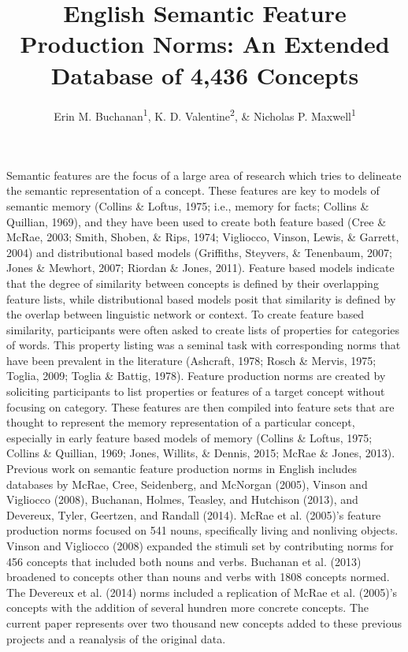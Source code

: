 \documentclass[english,,man]{apa6}
\title{English Semantic Feature Production Norms: An Extended Database of 4,436
Concepts}
\author{Erin M. Buchanan\textsuperscript{1}, K. D. Valentine\textsuperscript{2},
\& Nicholas P. Maxwell\textsuperscript{1}}
\date{}
\affiliation{
\vspace{0.5cm}
\textsuperscript{1} Missouri State University\\\textsuperscript{2} University of Missouri}
\theoremstyle{definition}
\theoremstyle{definition}
\theoremstyle{definition}
\theoremstyle{remark}
\begin{document}
\maketitle

Semantic features are the focus of a large area of research which tries
to delineate the semantic representation of a concept. These features
are key to models of semantic memory (Collins \& Loftus, 1975; i.e.,
memory for facts; Collins \& Quillian, 1969), and they have been used to
create both feature based (Cree \& McRae, 2003; Smith, Shoben, \& Rips,
1974; Vigliocco, Vinson, Lewis, \& Garrett, 2004) and distributional
based models (Griffiths, Steyvers, \& Tenenbaum, 2007; Jones \& Mewhort,
2007; Riordan \& Jones, 2011). Feature based models indicate that the
degree of similarity between concepts is defined by their overlapping
feature lists, while distributional based models posit that similarity
is defined by the overlap between linguistic network or context. To
create feature based similarity, participants were often asked to create
lists of properties for categories of words. This property listing was a
seminal task with corresponding norms that have been prevalent in the
literature (Ashcraft, 1978; Rosch \& Mervis, 1975; Toglia, 2009; Toglia
\& Battig, 1978). Feature production norms are created by soliciting
participants to list properties or features of a target concept without
focusing on category. These features are then compiled into feature sets
that are thought to represent the memory representation of a particular
concept, especially in early feature based models of memory (Collins \&
Loftus, 1975; Collins \& Quillian, 1969; Jones, Willits, \& Dennis,
2015; McRae \& Jones, 2013). Previous work on semantic feature
production norms in English includes databases by McRae, Cree,
Seidenberg, and McNorgan (2005), Vinson and Vigliocco (2008), Buchanan,
Holmes, Teasley, and Hutchison (2013), and Devereux, Tyler, Geertzen,
and Randall (2014). McRae et al. (2005)'s feature production norms
focused on 541 nouns, specifically living and nonliving objects. Vinson
and Vigliocco (2008) expanded the stimuli set by contributing norms for
456 concepts that included both nouns and verbs. Buchanan et al. (2013)
broadened to concepts other than nouns and verbs with 1808 concepts
normed. The Devereux et al. (2014) norms included a replication of McRae
et al. (2005)'s concepts with the addition of several hundren more
concrete concepts. The current paper represents over two thousand new
concepts added to these previous projects and a reanalysis of the
original data.
\end{document}

